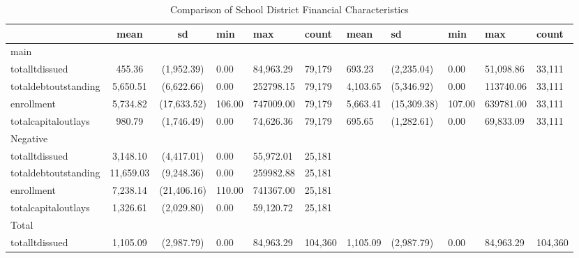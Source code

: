\begin{table}[htbp]\centering
\def\sym#1{\ifmmode^{#1}\else\(^{#1}\)\fi}
\caption{Comparison of School District Financial Characteristics}
\begin{tabular}{l*{2}{S}}
\toprule
                    &        mean&          sd&         min&         max&       count&        mean&          sd&         min&         max&       count\\
\midrule
main                &            &            &            &            &            &            &            &            &            &            \\
totalltdissued      &      455.36&  (1,952.39)&        0.00&   84,963.29&      79,179&      693.23&  (2,235.04)&        0.00&   51,098.86&      33,111\\
totaldebtoutstanding&    5,650.51&  (6,622.66)&        0.00&   252798.15&      79,179&    4,103.65&  (5,346.92)&        0.00&   113740.06&      33,111\\
enrollment          &    5,734.82& (17,633.52)&      106.00&   747009.00&      79,179&    5,663.41& (15,309.38)&      107.00&   639781.00&      33,111\\
totalcapitaloutlays &      980.79&  (1,746.49)&        0.00&   74,626.36&      79,179&      695.65&  (1,282.61)&        0.00&   69,833.09&      33,111\\
\midrule
Negative            &            &            &            &            &            &            &            &            &            &            \\
totalltdissued      &    3,148.10&  (4,417.01)&        0.00&   55,972.01&      25,181&            &            &            &            &            \\
totaldebtoutstanding&   11,659.03&  (9,248.36)&        0.00&   259982.88&      25,181&            &            &            &            &            \\
enrollment          &    7,238.14& (21,406.16)&      110.00&   741367.00&      25,181&            &            &            &            &            \\
totalcapitaloutlays &    1,326.61&  (2,029.80)&        0.00&   59,120.72&      25,181&            &            &            &            &            \\
\midrule
Total               &            &            &            &            &            &            &            &            &            &            \\
totalltdissued      &    1,105.09&  (2,987.79)&        0.00&   84,963.29&     104,360&    1,105.09&  (2,987.79)&        0.00&   84,963.29&     104,360\\

\end{tabular}
\end{table}
